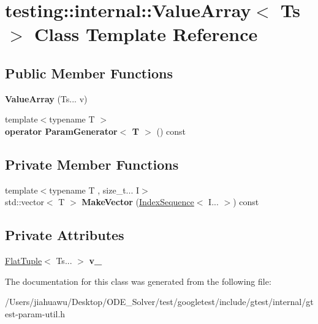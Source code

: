 \hypertarget{classtesting_1_1internal_1_1_value_array}{}\section{testing\+:\+:internal\+:\+:Value\+Array$<$ Ts $>$ Class Template Reference}
\label{classtesting_1_1internal_1_1_value_array}
\subsection*{Public Member Functions}
\begin{DoxyCompactItemize}
\item 
\mbox{\label{classtesting_1_1internal_1_1_value_array_acd7cd6a969a7e95152eac1787c42c9ed}} 
{\bfseries Value\+Array} (Ts... v)
\item 
\mbox{\label{classtesting_1_1internal_1_1_value_array_a019560f10debdce5f47bb18c0e5261b5}} 
{\footnotesize template$<$typename T $>$ }\\{\bfseries operator Param\+Generator$<$ T $>$} () const
\end{DoxyCompactItemize}
\subsection*{Private Member Functions}
\begin{DoxyCompactItemize}
\item 
\mbox{\label{classtesting_1_1internal_1_1_value_array_a738073a57459083586285f5055aeac19}} 
{\footnotesize template$<$typename T , size\+\_\+t... I$>$ }\\std\+::vector$<$ T $>$ {\bfseries Make\+Vector} (\mbox{\hyperlink{structtesting_1_1internal_1_1_index_sequence}{Index\+Sequence}}$<$ I... $>$) const
\end{DoxyCompactItemize}
\subsection*{Private Attributes}
\begin{DoxyCompactItemize}
\item 
\mbox{\label{classtesting_1_1internal_1_1_value_array_a13322bd870795fdd18dde7f95c4cedb0}} 
\mbox{\hyperlink{classtesting_1_1internal_1_1_flat_tuple}{Flat\+Tuple}}$<$ Ts... $>$ {\bfseries v\+\_\+}
\end{DoxyCompactItemize}


The documentation for this class was generated from the following file\+:\begin{DoxyCompactItemize}
\item 
/\+Users/jiahuawu/\+Desktop/\+O\+D\+E\+\_\+\+Solver/test/googletest/include/gtest/internal/gtest-\/param-\/util.\+h\end{DoxyCompactItemize}
